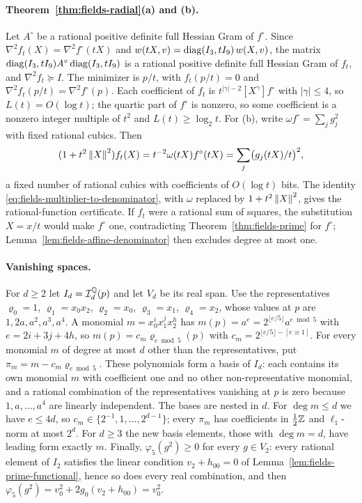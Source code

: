 \paragraph{Theorem~\ref{thm:fields-radial}(a) and (b).}
Let $A^\circ$ be a rational positive definite full Hessian Gram of
$f^\circ$. Since $\nabla^2f_t(X)=\nabla^2f^\circ(tX)$ and
$w(tX,v)=\operatorname{diag}(I_3,tI_9)\,w(X,v)$, the matrix
$\operatorname{diag}(I_3,tI_9)A^\circ\operatorname{diag}(I_3,tI_9)$ is a rational positive definite full
Hessian Gram of $f_t$, and $\nabla^2f_t\succeq I$. The minimizer is $p/t$, with
$f_t(p/t)=0$ and $\nabla^2f_t(p/t)=\nabla^2f^\circ(p)$. Each coefficient of
$f_t$ is $t^{|\gamma|-2}[X^\gamma]f^\circ$ with $|\gamma|\le4$, so
$L(t)=O(\log t)$; the quartic part of $f^\circ$ is nonzero, so some
coefficient is a nonzero integer multiple of $t^2$ and $L(t)\ge\log_2t$. For
(b), write $\omega f^\circ=\sum_jg_j^2$ with fixed rational cubics. Then
\[
 (1+t^2\left\lVert X\right\rVert^2)f_t(X)=t^{-2}\omega(tX)f^\circ(tX)
 =\sum_j\bigl(g_j(tX)/t\bigr)^2,
\]
a fixed number of rational cubics with coefficients of $O(\log t)$ bits.
The identity \eqref{eq:fields-multiplier-to-denominator}, with $\omega$
replaced by $1+t^2\left\lVert X\right\rVert^2$, gives the rational-function certificate. If
$f_t$ were a rational sum of squares, the substitution $X=x/t$ would make
$f^\circ$ one, contradicting Theorem~\ref{thm:fields-prime} for $f^\circ$;
Lemma~\ref{lem:fields-affine-denominator} then excludes degree at most one.

\paragraph{Vanishing spaces.}
For $d\ge2$ let $I_d=\mathcal I_d^\mathbb Q(p)$ and let $V_d$ be its real span. Use
the representatives $\varrho_0=1$, $\varrho_1=x_0x_2$, $\varrho_2=x_0$,
$\varrho_3=x_1$, $\varrho_4=x_2$, whose values at $p$ are
$1,2a,a^2,a^3,a^4$. A monomial $m=x_0^ix_1^jx_2^h$ has
$m(p)=a^e=2^{\lfloor e/5\rfloor}a^{e\bmod5}$ with $e=2i+3j+4h$, so
$m(p)=c_m\varrho_{e\bmod5}(p)$ with $c_m=2^{\lfloor e/5\rfloor-[e\equiv1]}$.
For every monomial $m$ of degree at most $d$ other than the representatives,
put $\pi_m=m-c_m\varrho_{e\bmod5}$. These polynomials form a basis of $I_d$:
each contains its own monomial $m$ with coefficient one and no other
non-representative monomial, and a rational combination of the
representatives vanishing at $p$ is zero because $1,a,\ldots,a^4$ are
linearly independent. The bases are nested in $d$. For $\deg m\le d$ we have
$e\le4d$, so $c_m\in\{2^{-1},1,\ldots,2^{d-1}\}$; every $\pi_m$ has
coefficients in $\frac12\mathbb Z$ and $\ell_1$-norm at most $2^d$. For $d\ge3$ the
new basis elements, those with $\deg m=d$, have leading form exactly $m$.
Finally, $\varphi_5(g^2)\ge0$ for every $g\in V_2$: every rational element of
$I_2$ satisfies the linear condition $v_2+h_{00}=0$ of
Lemma~\ref{lem:fields-prime-functional}, hence so does every real combination,
and then $\varphi_5(g^2)=v_0^2+2g_0(v_2+h_{00})=v_0^2$.

